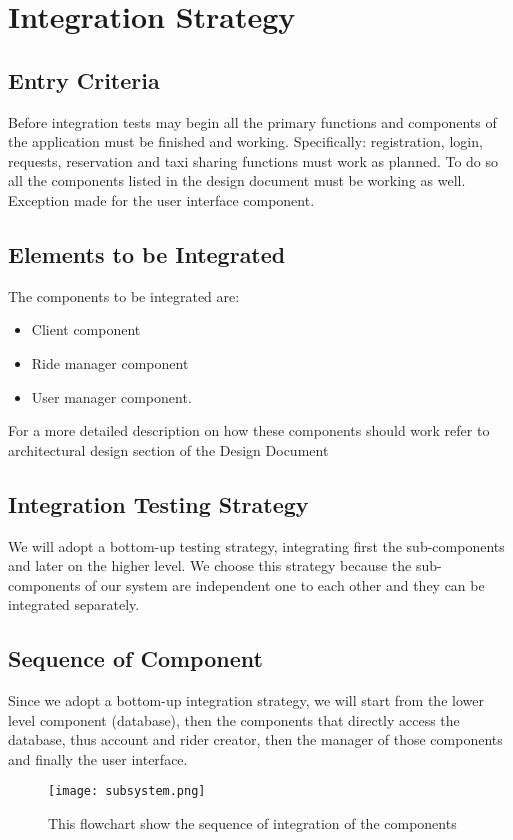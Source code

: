 \section{Integration Strategy}

\subsection{Entry Criteria}
Before integration tests may begin all the primary functions and components of the application must be finished and working.
Specifically: registration, login, requests, reservation and taxi sharing functions must work as planned. To do so all the components listed in the design document must be working as well. Exception made for the user interface component.

\subsection{Elements to be Integrated}
The components to be integrated are:
\begin{itemize}
	\item Client component
	\item Ride manager component
	\item User manager component. 
\end{itemize}
For a more detailed description on how these components should work refer to architectural design section of the Design Document

\subsection{Integration Testing Strategy}
We will adopt a bottom-up testing strategy, integrating first the sub-components and later on the higher level. 
We choose this strategy because the sub-components of our system are independent one to each other and they can be integrated separately.

\subsection{Sequence of Component}
Since we adopt a bottom-up integration strategy, we will start from the lower level component (database), then the components that directly access the database, thus account and rider creator, then the manager of those components and finally the user interface.
\begin{figure}[h]
		\centering
		\texttt{[image: subsystem.png]}
		\caption{This flowchart show the sequence of integration of the components}
\end{figure}
